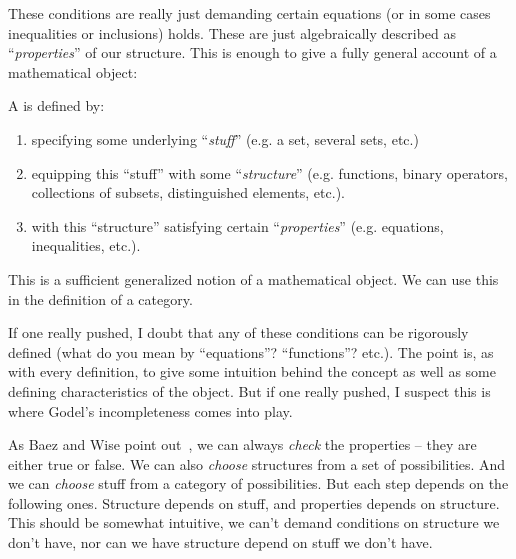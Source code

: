 These conditions are really just demanding certain equations (or
in some cases inequalities or inclusions) holds. These are just
algebraically described as ``\emph{properties}'' of our
structure. This is enough to give a fully general account of a
mathematical object:
\begin{framed}
\begin{defn}\label{defn:object}
A  is defined by:
\begin{enumerate}
\item specifying some underlying ``\emph{stuff}'' (e.g. a set, several sets, etc.)
\item equipping this ``stuff'' with some ``\emph{structure}''
  (e.g. functions, binary operators, collections of subsets,
  distinguished elements, etc.).
\item with this ``structure'' satisfying certain
  ``\emph{properties}'' (e.g. equations, inequalities, etc.).
\end{enumerate}
\end{defn}
\end{framed}
This is a sufficient generalized notion of a mathematical
object. We can use this in the definition of a category.

\begin{rmk}
If one really pushed, I doubt that any of these conditions can be
rigorously defined (what do you mean by ``equations''?
``functions''? etc.). The point is, as with every definition, to
give some intuition behind the concept as well as some defining
characteristics of the object. But if one really pushed, I
suspect this is where Godel's incompleteness comes into play.
\end{rmk}

\begin{rmk}
As Baez and Wise point out~\cite{BaezWise:2004ln}, we can always
\emph{check} the properties -- they are either true or false. We
can also \emph{choose} structures from a set of
possibilities. And we can \emph{choose} stuff from a category of
possibilities. But each step depends on the following
ones. Structure depends on stuff, and properties depends on
structure. This should be somewhat intuitive, we can't demand
conditions on structure we don't have, nor can we have structure
depend on stuff we don't have.
\end{rmk}

